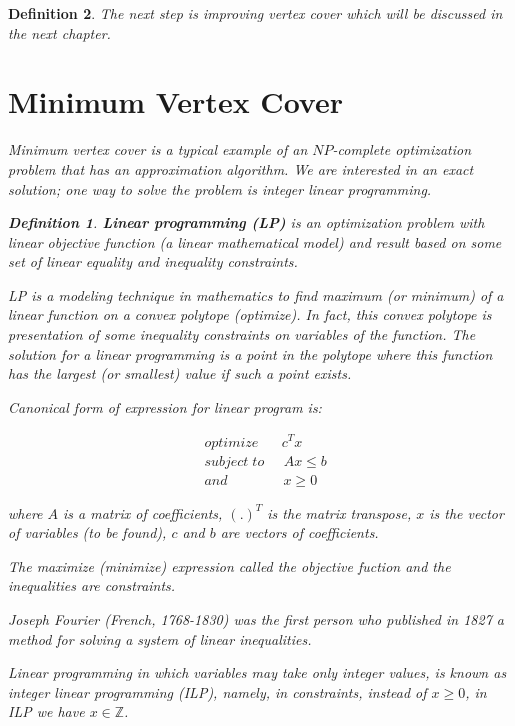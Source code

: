 \documentclass[12pt]{article}
\theoremstyle{slplain}
\newtheorem{defi}{Definition}
\begin{document}
\begin{defi}
The next step is improving vertex cover which will be discussed in the next chapter.






\newpage
\section{Minimum Vertex Cover}{\label{vertex_cover}}
Minimum vertex cover is a typical example of an $NP$-complete optimization problem that has an approximation algorithm. We are interested in an exact solution; one way to solve the problem is integer linear programming.

\begin{defi}
{\bf Linear programming (LP)} is an optimization problem with linear objective function (a linear mathematical model) and result based on some set of linear equality and inequality constraints. 

LP is a modeling technique in mathematics to find maximum (or minimum) of a linear function on a convex polytope (optimize). In fact, this convex polytope is presentation of some inequality constraints on variables of the function. The solution for a linear programming is a point in the polytope where this function has the largest (or smallest) value if such a point exists.

Canonical form of expression for linear program is:

\begin{align*}
&optimize \; \;\; \;\;\; c^Tx\\
&subject\; to \;\;\; \;\; Ax \leq b\\
&and	\qquad\qquad	 x \geq 0
\end{align*}

where $A$ is a matrix of coefficients, $(.)^T$ is the matrix transpose, $x$ is the vector of variables (to be found), $c$ and $b$ are vectors of coefficients.

The maximize (minimize) expression called the objective fuction and the inequalities are constraints.

Joseph Fourier (French, 1768-1830) was the first person who published in 1827 a method for solving a system of linear inequalities. \cite{gerard}

Linear programming in which variables may take only integer values, is known as integer linear programming (ILP), namely, in constraints, instead of $x\geq 0$, in ILP we have $x\in \mathbb{Z}$.
\end{defi}



\end{defi}
\end{document}

